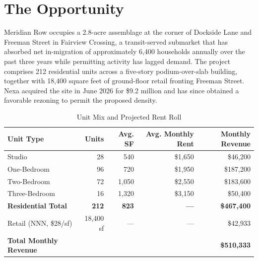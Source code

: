 \section{The Opportunity}
Meridian Row occupies a 2.8-acre assemblage at the corner of Dockside Lane and Freeman Street
in Fairview Crossing, a transit-served submarket that has absorbed net in-migration of
approximately 6,400 households annually over the past three years while permitting activity has
lagged demand. The project comprises 212 residential units across a five-story
podium-over-slab building, together with 18,400 square feet of ground-floor retail fronting
Freeman Street. Nexa acquired the site in June 2026 for \$9.2 million and has since obtained a
favorable rezoning to permit the proposed density.

\begin{table}[H]
\centering
\caption{Unit Mix and Projected Rent Roll}
\label{tab:unitmix}
\vspace{4pt}
\begin{tabularx}{\linewidth}{X r r r r}
\toprule
\rowcolor{jvnavy}
\textbf{\color{white}Unit Type} & \textbf{\color{white}Units} & \textbf{\color{white}Avg. SF} & \textbf{\color{white}Avg. Monthly Rent} & \textbf{\color{white}Monthly Revenue} \\
\midrule
Studio & 28 & 540 & \$1,650 & \$46,200 \\
\rowcolor{jvcream}
One-Bedroom & 96 & 720 & \$1,950 & \$187,200 \\
Two-Bedroom & 72 & 1,050 & \$2,550 & \$183,600 \\
\rowcolor{jvcream}
Three-Bedroom & 16 & 1,320 & \$3,150 & \$50,400 \\
\midrule
\textbf{Residential Total} & \textbf{212} & \textbf{823} & \textbf{---} & \textbf{\$467,400} \\
\rowcolor{jvcream}
Retail (NNN, \$28/sf) & 18,400 sf & --- & --- & \$42,933 \\
\midrule
\textbf{Total Monthly Revenue} & & & & \textbf{\$510,333} \\
\bottomrule
\end{tabularx}
\end{table}


